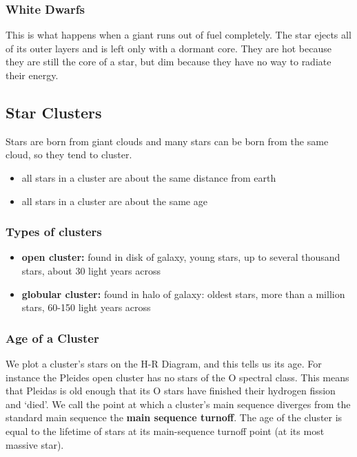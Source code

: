 \subsubsection{White Dwarfs}
This is what happens when a giant runs out of fuel completely. The star ejects all of its outer layers and is left only with a dormant core. They are hot because they are still the core of a star, but dim because they have no way to radiate their energy.

\subsection{Star Clusters}
Stars are born from giant clouds and many stars can be born from the same cloud, so they tend to cluster.
\begin{itemize}
\item all stars in a cluster are about the same distance from earth
\item all stars in a cluster are about the same age
\end{itemize}

\subsubsection{Types of clusters}
\begin{itemize}
\item \textbf{open cluster: }found in disk of galaxy, young stars, up to several thousand stars, about 30 light years across
\item \textbf{globular cluster: }found in halo of galaxy: oldest stars, more than a million stars, 60-150 light years across
\end{itemize}

\subsubsection{Age of a Cluster}
We plot a cluster's stars on the H-R Diagram, and this tells us its age. For instance the Pleides open cluster has no stars of the O spectral class. This means that Pleidas is old enough that its O stars have finished their hydrogen fission and `died'. We call the point at which a cluster's main sequence diverges from the standard main sequence the \textbf{main sequence turnoff}. The age of the cluster is equal to the lifetime of stars at its main-sequence turnoff point (at its most massive star).
